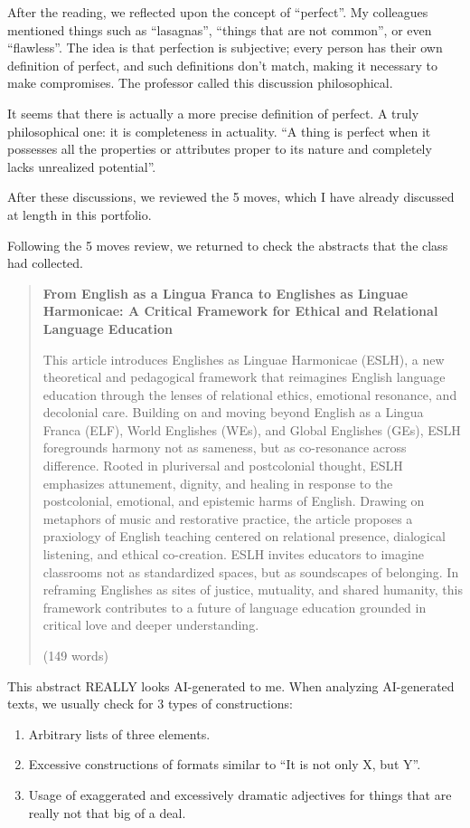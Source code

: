 After the reading, we reflected upon the concept of ``perfect''. My colleagues mentioned things such as ``lasagnas'', ``things that are not common'', or even ``flawless''. The idea is that perfection is subjective; every person has their own definition of perfect, and such definitions don't match, making it necessary to make compromises. The professor called this discussion philosophical.

It seems that there is actually a more precise definition of perfect. A truly philosophical one: it is completeness in actuality. ``A thing is perfect when it possesses all the properties or attributes proper to its nature and completely lacks unrealized potential''.

After these discussions, we reviewed the 5 moves, which I have already discussed at length in this portfolio.

Following the 5 moves review, we returned to check the abstracts that the class had collected.


\begin{quote}
    \textbf{From English as a Lingua Franca to Englishes as Linguae Harmonicae: A Critical Framework for Ethical and Relational Language Education}

    This article introduces Englishes as Linguae Harmonicae (ESLH), a new theoretical and pedagogical framework that reimagines English language education through the lenses of relational ethics, emotional resonance, and decolonial care. Building on and moving beyond English as a Lingua Franca (ELF), World Englishes (WEs), and Global Englishes (GEs), ESLH foregrounds harmony not as sameness, but as co-resonance across difference. Rooted in pluriversal and postcolonial thought, ESLH emphasizes attunement, dignity, and healing in response to the postcolonial, emotional, and epistemic harms of English. Drawing on metaphors of music and restorative practice, the article proposes a praxiology of English teaching centered on relational presence, dialogical listening, and ethical co-creation. ESLH invites educators to imagine classrooms not as standardized spaces, but as soundscapes of belonging. In reframing Englishes as sites of justice, mutuality, and shared humanity, this framework contributes to a future of language education grounded in critical love and deeper understanding.
    
    (149 words)
\end{quote}

This abstract REALLY looks AI-generated to me. When analyzing AI-generated texts, we usually check for 3 types of constructions:
\begin{enumerate}
    \item Arbitrary lists of three elements.
    \item Excessive constructions of formats similar to ``It is not only X, but Y''.
    \item Usage of exaggerated and excessively dramatic adjectives for things that are really not that big of a deal.
\end{enumerate}

